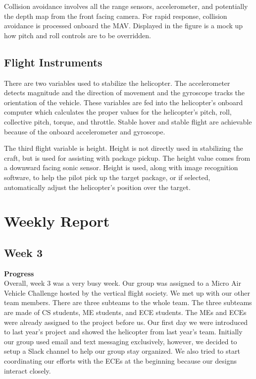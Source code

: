 \documentclass[onecolumn, oneside, letterpaper, draftclsnofoot, 10pt, compsoc]{IEEEtran}
\begin{document}
\noindent
Collision avoidance involves all the range sensors, accelerometer, and potentially the depth map from the front facing camera. For rapid response, collision avoidance is processed onboard the MAV. Displayed in the figure is a mock up how pitch and roll controls are to be overridden.

\subsection{Flight Instruments}
There are two variables used to stabilize the helicopter. The accelerometer detects magnitude and the direction of movement and the gyroscope tracks the orientation of the vehicle. These variables are fed into the helicopter's onboard computer which calculates the proper values for the helicopter’s pitch, roll, collective pitch, torque, and throttle. Stable hover and stable flight are achievable because of the onboard accelerometer and gyroscope.

\noindent
The third flight variable is height. Height is not directly used in stabilizing the craft, but is used for assisting with package pickup. The height value comes from a downward facing sonic sensor. Height is used, along with image recognition software, to help the pilot pick up the target package, or if selected, automatically adjust the helicopter’s position over the target.


\section{Weekly Report}

\subsection{Week 3}
\noindent \textbf{Progress}\\ \noindent
Overall, week 3 was a very busy week. Our group was assigned to a Micro Air Vehicle Challenge hosted by the vertical flight society. We met up with our other team members. There are three subteams to the whole team. The three subteams are made of CS students, ME students, and ECE students. The MEs and ECEs were already assigned to the project before us. Our first day we were introduced to last year's project and showed the helicopter from last year’s team. Initially our group used email and text messaging exclusively, however, we decided to setup a Slack channel to help our group stay organized. We also tried to start coordinating our efforts with the ECEs at the beginning because our designs interact closely.
\end{document}
